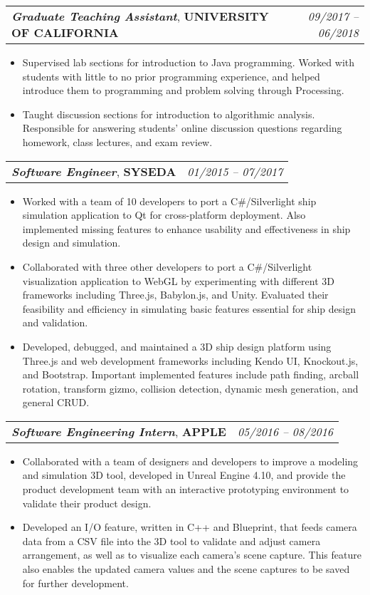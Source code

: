 \documentclass[letterpaper,11pt]{article}
\makeatletter
\newcommand{\resumeItem}[1]{
  \item \small{#1}
}
\newcommand{\resumeExperienceSubheading}[3]{
  \vspace{-1pt}\item
    \begin{tabular*}{0.97\textwidth}[t]{l@{\extracolsep{\fill}}r}
      \textbf{\textit{#1}}, \textbf{#2} & \textit{#3} \\
    \end{tabular*}\vspace{-5pt}
}
\newcommand{\resumeItemListStart}{\begin{itemize}}
\newcommand{\resumeItemListEnd}{\end{itemize}\vspace{-5pt}}
\makeatother
\begin{document}
    \resumeExperienceSubheading
      {Graduate Teaching Assistant}{UNIVERSITY OF CALIFORNIA}{09/2017 -- 06/2018}
      \resumeItemListStart
        \resumeItem
          {Supervised lab sections for introduction to Java programming. Worked with students with little to no prior programming 
          experience, and helped introduce them to programming and problem solving through Processing.}
        \resumeItem
          {Taught discussion sections for introduction to algorithmic analysis. Responsible for 
          answering students' online discussion questions regarding homework, class lectures, and exam review.}
      \resumeItemListEnd

      \resumeExperienceSubheading
      {Software Engineer}{SYSEDA}{01/2015 -- 07/2017}
      \resumeItemListStart
        \resumeItem
          {Worked with a team of 10 developers to port a C\#/Silverlight ship simulation application to Qt for cross-platform deployment. 
          Also implemented missing features to enhance usability and effectiveness in ship design and 
          simulation.}
        \resumeItem
          {Collaborated with three other developers to port a C\#/Silverlight visualization application to WebGL by experimenting with 
          different 3D frameworks including Three.js, Babylon.js, and Unity. Evaluated their feasibility and efficiency in simulating 
          basic features essential for ship design and validation.}
        \resumeItem
          {Developed, debugged, and maintained a 3D ship design platform using Three.js and web development frameworks including Kendo UI, 
          Knockout.js, and Bootstrap. Important implemented features include path finding, arcball rotation, transform gizmo, collision 
          detection, dynamic mesh generation, and general CRUD.}
      \resumeItemListEnd

      \resumeExperienceSubheading
      {Software Engineering Intern}{APPLE}{05/2016 -- 08/2016}
      \resumeItemListStart
        \resumeItem
          {Collaborated with a team of designers and developers to improve a modeling and simulation 3D tool, developed in 
          Unreal Engine 4.10, and provide the product development team with an interactive prototyping environment to validate their 
          product design.}
        \resumeItem
          {Developed an I/O feature, written in C++ and Blueprint, that feeds camera data from a CSV file into the 3D tool to validate 
          and adjust camera arrangement, as well as to visualize each camera’s scene capture. This feature also enables the updated 
          camera values and the scene captures to be saved for further development.}
      \resumeItemListEnd
\end{document}

